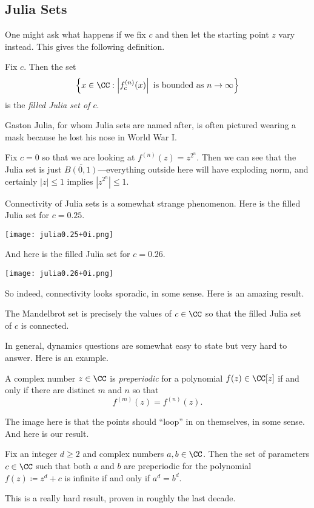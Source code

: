 \documentclass[../notes.tex]{subfiles}
\begin{document}
\subsection{Julia Sets}
One might ask what happens if we fix $c$ and then let the starting point $z$ vary instead. This gives the following definition.
\begin{definition}
	Fix $c$. Then the set
	\[\left\{x\in\CC:\left|f^{(n)}_c(x)\right|\text{ is bounded as }n\to\infty\right\}\]
	is the \textit{filled Julia set of $c$}.
\end{definition}
\begin{remark}
	Gaston Julia, for whom Julia sets are named after, is often pictured wearing a mask because he lost his nose in World War I.
\end{remark}
\begin{example}
	Fix $c=0$ so that we are looking at $f^{(n)}(z)=z^{2^n}$. Then we can see that the Julia set is just $\overline{B(0,1)}$---everything outside here will have exploding norm, and certainly $|z|\le1$ implies $\left|z^{2^n}\right|\le1$.
\end{example}
Connectivity of Julia sets is a somewhat strange phenomenon. Here is the filled Julia set for $c=0.25$.
\begin{center}
	\texttt{[image: julia0.25+0i.png]}
\end{center}
And here is the filled Julia set for $c=0.26$.
\begin{center}
	\texttt{[image: julia0.26+0i.png]}
\end{center}
So indeed, connectivity looks sporadic, in some sense. Here is an amazing result.
\begin{theorem}
	The Mandelbrot set is precisely the values of $c\in\CC$ so that the filled Julia set of $c$ is connected.
\end{theorem}
In general, dynamics questions are somewhat easy to state but very hard to answer. Here is an example.
\begin{definition}
	A complex number $z\in\CC$ is \textit{preperiodic} for a polynomial $f(z)\in\CC[z]$ if and only if there are distinct $m$ and $n$ so that
	\[f^{(m)}(z)=f^{(n)}(z).\]
\end{definition}
The image here is that the points should ``loop'' in on themselves, in some sense. And here is our result.
\begin{theorem}
	Fix an integer $d\ge2$ and complex numbers $a,b\in\CC$. Then the set of parameters $c\in\CC$ such that both $a$ and $b$ are preperiodic for the polynomial $f(z)\coloneqq z^d+c$ is infinite if and only if $a^d=b^d$.
\end{theorem}
This is a really hard result, proven in roughly the last decade.
\end{document}
